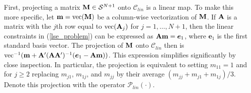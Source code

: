\documentclass[11pt]{article}
\theoremstyle{definition}
\theoremstyle{definition}
\def\s{{\bf s}}
\def\m{{\bf m}}
\def\A{{\bf A}}
\def\M{{\bf M}}
\def\vec{\text{vec}}
\begin{document}
First, projecting a matrix $\M \in \mathcal{S}^{N+1}$  onto $\mathcal{C}_{lin}$ is a linear map. To make this more specific, let $\m = \vec(\M)$ be a column-wise vectorization of $\M$. 
If $\A$ is a matrix with the $j$th row equal to $\vec(\A_j)$ for $j = 1, \dots, N+1$, then the  linear constraints in (\ref{lse_problem}) can be expressed as $\A\m =  \boldsymbol{e}_1$, where $\boldsymbol{e}_1$ is the first standard basis vector. The projection of  $\M$ onto $\mathcal{C}_{lin}$ then is $\vec^{-1}(\m + \A' (\A \A')^{-1}(\boldsymbol{e}_1 - \A\m))$. This expression simplifies significantly by close inspection. In particular, the projection is equivalent to setting $m_{11} = 1$ and for $j \geq 2$ replacing $m_{j1}$, $m_{1j}$, and $m_{jj}$ by their average $(m_{jj} + m_{j1} + m_{1j})/3$. Denote this projection with the operator $\mathcal{P}_{lin}(\cdot)$. 
\end{document}
